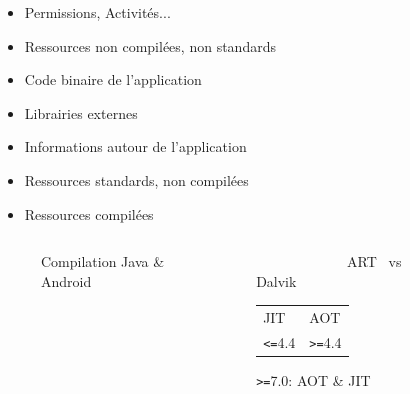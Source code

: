 \documentclass[aspectratio=1610]{beamer}%
\begin{document}
\begin{frame}
\begin{columns}
\begin{column}{0.6\linewidth}
        {\scriptsize
        \begin{itemize}%
        \item<3-> [~] Permissions, Activités...
        \item<4-> [~] Ressources non compilées, non standards
        \item<5-> [~] Code binaire de l'application
        \item<6-> [~] Librairies externes
        \item<7-> [~] Informations autour de l'application
        \item<8-> [~] Ressources standards, non compilées
        \item<9-> [~] Ressources compilées
        \end{itemize}
        }
      \end{column}
    \end{columns}
  \end{frame}
  \begin{frame}
    \slidetitle[Compilation]
    \pause
    \begin{columns}
      \begin{column}{0.5\linewidth}
        \begin{figure}
          \vspace{-0.5cm}
          
          \vspace{-0.25cm}
          \caption{Compilation Java \& Android}
        \end{figure}
      \end{column}
    \begin{column}{0.5\linewidth}
      \pause
      \begin{block}{
        ~~~~~~~~~~~~~ART \hfill ~vs \hfill Dalvik~~~~~~~~~~~~
      }
        \pause
        \begin{tabularx}{\textwidth}{YY}
        JIT & AOT \\
        \texttt{<=}4.4 & \texttt{>=}4.4
        \end{tabularx}
        \centering
        \pause
        \texttt{>=}7.0: AOT \& JIT
      \end{block}
    \end{column}
  \end{columns}
\end{frame}
\end{document}
